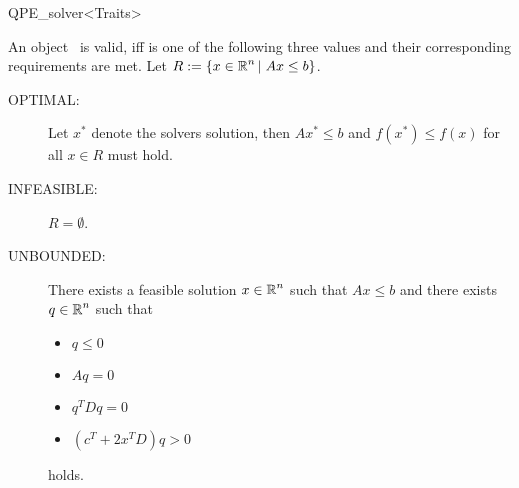 \begin{ccRefClass}{QPE_solver<Traits>}
\begin{ccIndexMemberFunctions}
An object \ccVar\ is valid, iff  is one of the following
three values and their corresponding requirements are met. Let
$R:=\{x \in \mbox{$\mathbb R$}^{n}\left|\right. Ax \leq b\}$.
\begin{description}
\item[OPTIMAL:] Let $x^{*}$ denote the solvers solution, then 
$Ax^{*} \leq b$ and $f(x^{*}) \leq f(x)$ for all $x \in R$ must hold.
\item[INFEASIBLE:] $R = \emptyset$.
\item[UNBOUNDED:] There exists a feasible solution $x \in \mbox{$\mathbb R$}^{n}$ such that
$Ax \leq b$ and there exists $q \in \mbox{$\mathbb R$}^{n}$ such that
  \begin{itemize}
    \item $q \leq 0$
    \item $Aq = 0$
    \item $q^{T}Dq=0$
    \item $(c^{T} + 2x^{T}D)q > 0$
  \end{itemize}
holds.
\end{description}




\end{ccIndexMemberFunctions}


\ccSeeAlso
%
    \\
    \\
    \\
    \\

\ccImplementation
\ccIndexImplementation


\ccExample
{}

\end{ccRefClass}


